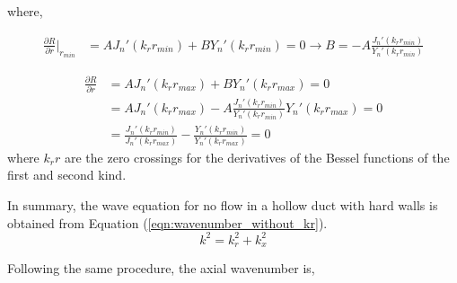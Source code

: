 where,


\begin{align*} 
    \frac{ \partial R}{\partial r}|_{r_{min}} &= AJ_n'(k_r r_{min}) + B Y_n' (k_r r_{min}) = 0 
    \rightarrow B = -A \frac{J_n'(k_r r_{min})}{Y_n'(k_r r_{min})}
\end{align*}


\begin{align*} 
    \frac{ \partial R}{\partial r} &= AJ_n'(k_r r_{max}) + B Y_n' (k_r r_{max}) = 0 \\
                                   &= AJ_n'(k_r r_{max}) - A\frac{J_n' (k_r r_{min})}{Y_n'(k_r r_{min})} Y_n' (k_r r_{max}) = 0 \\
                                   &= \frac{J_n'(k_r r_{min})}{J_n' (k_r r_{max})} - \frac{Y_n'(k_r r_{min})}{Y_n' (k_r r_{max})} = 0 
\end{align*}
where $k_r r$ are the zero crossings for the derivatives of the Bessel functions of the first and second kind.

In summary, the wave equation for no flow in a hollow duct with hard walls is obtained 
from Equation (\ref{eqn:wavenumber_without_kr}).
\begin{equation}
    k^2 = k_r^2 + k_x^2
    \label{eqn:wavenumber_equation}
\end{equation}


Following the same procedure, the axial wavenumber is,






